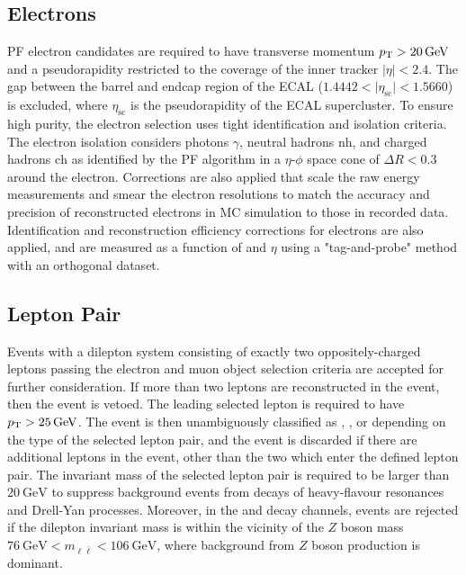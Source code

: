\subsection{Electrons}
PF electron candidates are required to have transverse momentum $\pT > \SI{20}{\GeV}$ and a pseudorapidity restricted to the coverage of the inner tracker $\vert \eta \vert < 2.4$.
The gap between the barrel and endcap region of the ECAL ($1.4442 < \vert \eta_\mathrm{sc} \vert < 1.5660$) is excluded, where $\eta_\mathrm{sc}$ is the pseudorapidity of the ECAL supercluster.
To ensure high purity, the electron selection uses tight identification and isolation criteria.
The electron isolation considers photons $\gamma$, neutral hadrons $\mathrm{nh}$, and charged hadrons $\mathrm{ch}$ as identified by the PF algorithm in a $\eta$-$\phi$ space cone of $\Delta R < 0.3$ around the electron.
Corrections are also applied that scale the raw energy measurements and smear the electron resolutions to match the accuracy and precision of reconstructed electrons in MC simulation to those in recorded data.
Identification and reconstruction efficiency corrections for electrons are also applied, and are measured as a function of \pT and $\eta$ using a "tag-and-probe" method with an orthogonal dataset.

\subsection{Lepton Pair}
Events with a dilepton system consisting of exactly two oppositely-charged leptons passing the electron and muon object selection criteria are accepted for further consideration.
If more than two leptons are reconstructed in the event, then the event is vetoed.
The leading selected lepton is required to have $\pT > \SI{25}{\GeV}$.
The event is then unambiguously classified as \ee, \emu, or \mumu depending on the type of the selected lepton pair, and the event is discarded if there are additional leptons in the event, other than the two which enter the defined lepton pair.
The invariant mass of the selected lepton pair is required to be larger than $\SI{20}{\GeV}$ to suppress background events from decays of heavy-flavour resonances and Drell-Yan processes.
Moreover, in the \mumu and \ee decay channels, events are rejected if the dilepton invariant mass is within the vicinity of the $Z$ boson mass $\SI{76}{\GeV} < m_{\ell\bar{\ell}} < \SI{106}{\GeV}$, where background from $Z$ boson production is dominant.

